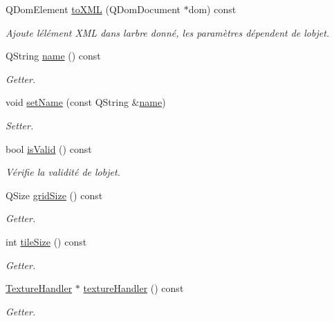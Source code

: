 \begin{DoxyCompactItemize}
Q\+Dom\+Element \hyperlink{class_editor_level_ad8997f78f2a066e8430f5927c881f6b6}{to\+X\+M\+L} (Q\+Dom\+Document $\ast$dom) const 
\begin{DoxyCompactList}\small\item\em Ajoute l\textquotesingle{}élément X\+M\+L dans l\textquotesingle{}arbre donné, les paramètres dépendent de l\textquotesingle{}objet. \end{DoxyCompactList}\item 
Q\+String \hyperlink{class_editor_level_a9f9dbcffe902389116e3456e7f154a63}{name} () const 
\begin{DoxyCompactList}\small\item\em Getter. \end{DoxyCompactList}\item 
void \hyperlink{class_editor_level_a04a0104522b5d989a92a778d276f9630}{set\+Name} (const Q\+String \&\hyperlink{class_editor_level_a9f9dbcffe902389116e3456e7f154a63}{name})
\begin{DoxyCompactList}\small\item\em Setter. \end{DoxyCompactList}\item 
bool \hyperlink{class_editor_level_a67a93de9672f6fccee0b8ebe787d976d}{is\+Valid} () const 
\begin{DoxyCompactList}\small\item\em Vérifie la validité de l\textquotesingle{}objet. \end{DoxyCompactList}\item 
Q\+Size \hyperlink{class_editor_level_af1274ae16db55ca0f0458771f9b492f7}{grid\+Size} () const 
\begin{DoxyCompactList}\small\item\em Getter. \end{DoxyCompactList}\item 
int \hyperlink{class_editor_level_a017777a7184231516d4052b83a61c2ec}{tile\+Size} () const 
\begin{DoxyCompactList}\small\item\em Getter. \end{DoxyCompactList}\item 
\hyperlink{class_texture_handler}{Texture\+Handler} $\ast$ \hyperlink{class_editor_level_a1c7d7af96145635ca7a6b896bc00a2ee}{texture\+Handler} () const 
\begin{DoxyCompactList}\small\item\em Getter. \end{DoxyCompactList}\item 

\end{DoxyCompactItemize}
